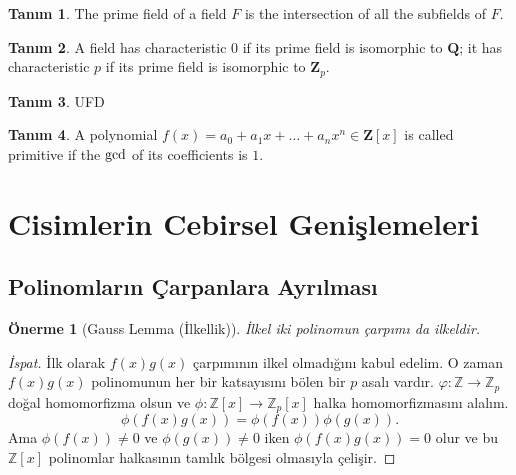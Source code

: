 \documentclass[draft]{article}
\newtheorem{prop}[thm]{Önerme}
\theoremstyle{definition}
\newtheorem{defn}{Tanım}[section]
\theoremstyle{remark}
\begin{document}
    		\begin{defn}
    			The prime field of a field $F$ is the intersection of all the subfields of $F$.
    		\end{defn}
    		
    		\begin{defn}
    			A field has characteristic $0$ if its prime field is isomorphic to $\mathbf{Q}$; it has characteristic $p$ if its prime field is isomorphic to $\mathbf{Z}_p$.
    		\end{defn}
    		
    		\begin{defn}
    		    UFD
    		\end{defn}
    		
    		\begin{defn}
    			A polynomial $f(x) = a_0 + a_1x + \dots + a_nx^n \in \mathbf{Z}[x]$ is called primitive if the $\textup{gcd}$ of its coefficients is $1$.
    		\end{defn}
    		
		    
	\section{Cisimlerin Cebirsel Genişlemeleri}
	
		\subsection{Polinomların Çarpanlara Ayrılması}
		
		    \begin{prop}[Gauss Lemma (İlkellik)]
		        İlkel iki polinomun çarpımı da ilkeldir.
		    \end{prop}
		    
		    \begin{proof}[İspat]
		        İlk olarak $f(x)g(x)$ çarpımının ilkel olmadığını kabul edelim. O zaman $f(x)g(x)$ polinomunun her bir katsayısını bölen bir $p$ asalı vardır.
		        $\varphi: \mathbb{Z} \to \mathbb{Z}_p$ doğal homomorfizma olsun ve $\phi: \mathbb{Z}[x] \to \mathbb{Z}_p[x]$ halka homomorfizmasını alalım.
		        \begin{equation*}
		            \phi(f(x)g(x)) = \phi(f(x))\phi(g(x)).
		        \end{equation*}
		        Ama $\phi(f(x)) \neq 0$ ve $\phi(g(x)) \neq 0$ iken $\phi(f(x)g(x)) = 0$ olur ve bu $\mathbb{Z}[x]$ polinomlar halkasının tamlık bölgesi olmasıyla çelişir.
		    \end{proof}
			
\end{document}
